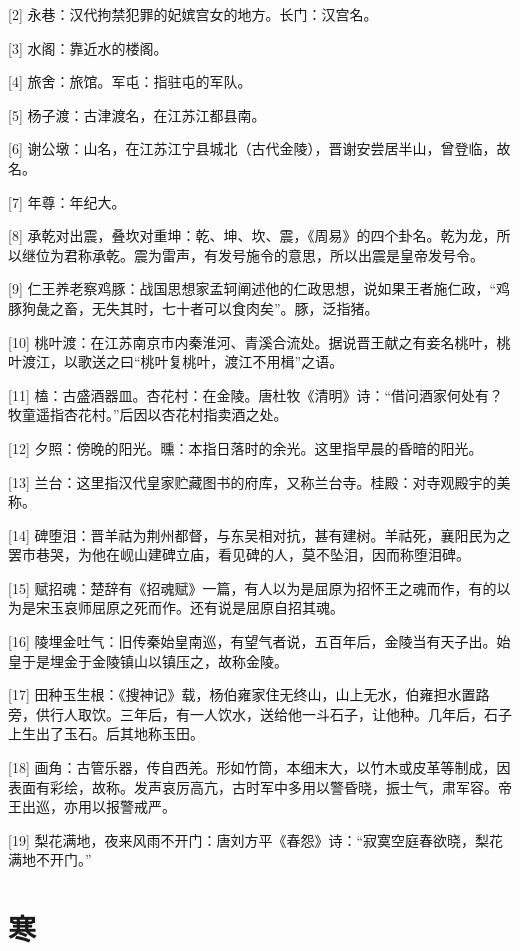 \documentclass[12pt,UTF8]{ctexbook}
\begin{document}
[2] 永巷：汉代拘禁犯罪的妃嫔宫女的地方。长门：汉宫名。

[3] 水阁：靠近水的楼阁。

[4] 旅舍：旅馆。军屯：指驻屯的军队。

[5] 杨子渡：古津渡名，在江苏江都县南。

[6] 谢公墩：山名，在江苏江宁县城北（古代金陵），晋谢安尝居半山，曾登临，故名。

[7] 年尊：年纪大。

[8] 承乾对出震，叠坎对重坤：乾、坤、坎、震，《周易》的四个卦名。乾为龙，所以继位为君称承乾。震为雷声，有发号施令的意思，所以出震是皇帝发号令。

[9] 仁王养老察鸡豚：战国思想家孟轲阐述他的仁政思想，说如果王者施仁政，“鸡豚狗彘之畜，无失其时，七十者可以食肉矣”。豚，泛指猪。

[10] 桃叶渡：在江苏南京市内秦淮河、青溪合流处。据说晋王献之有妾名桃叶，桃叶渡江，以歌送之曰“桃叶复桃叶，渡江不用楫”之语。

[11] 榼：古盛酒器皿。杏花村：在金陵。唐杜牧《清明》诗：“借问酒家何处有？牧童遥指杏花村。”后因以杏花村指卖酒之处。

[12] 夕照：傍晚的阳光。曛：本指日落时的余光。这里指早晨的昏暗的阳光。

[13] 兰台：这里指汉代皇家贮藏图书的府库，又称兰台寺。桂殿：对寺观殿宇的美称。

[14] 碑堕泪：晋羊祜为荆州都督，与东吴相对抗，甚有建树。羊祜死，襄阳民为之罢巿巷哭，为他在岘山建碑立庙，看见碑的人，莫不坠泪，因而称堕泪碑。

[15] 赋招魂：楚辞有《招魂赋》一篇，有人以为是屈原为招怀王之魂而作，有的以为是宋玉哀师屈原之死而作。还有说是屈原自招其魂。

[16] 陵埋金吐气：旧传秦始皇南巡，有望气者说，五百年后，金陵当有天子出。始皇于是埋金于金陵镇山以镇压之，故称金陵。

[17] 田种玉生根：《搜神记》载，杨伯雍家住无终山，山上无水，伯雍担水置路旁，供行人取饮。三年后，有一人饮水，送给他一斗石子，让他种。几年后，石子上生出了玉石。后其地称玉田。

[18] 画角：古管乐器，传自西羌。形如竹筒，本细末大，以竹木或皮革等制成，因表面有彩绘，故称。发声哀厉高亢，古时军中多用以警昏晓，振士气，肃军容。帝王出巡，亦用以报警戒严。

[19] 梨花满地，夜来风雨不开门：唐刘方平《春怨》诗：“寂寞空庭春欲晓，梨花满地不开门。”





\chapter{寒}
\end{document}

